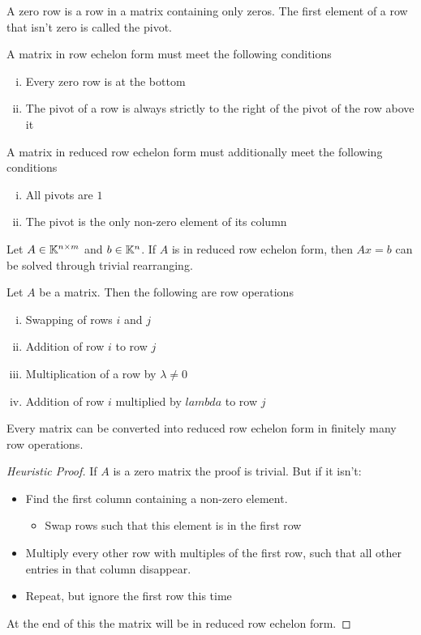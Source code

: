 \documentclass[../../script.tex]{subfiles}
\begin{document}
\begin{defi}
	A zero row is a row in a matrix containing only zeros. The first element of a row that isn't zero is called the pivot.

	A matrix in row echelon form must meet the following conditions
	\begin{enumerate}[(i)]
		 \item Every zero row is at the bottom
		 \item The pivot of a row is always strictly to the right of the pivot of the row above it
	\end{enumerate}

	A matrix in reduced row echelon form must additionally meet the following conditions
	\begin{enumerate}[(i)]
		\item All pivots are $1$
		\item The pivot is the only non-zero element of its column
	\end{enumerate}
\end{defi}

\begin{rem}
	Let $A \in \mathbb{K}^{n \times m}$ and $b \in \mathbb{K}^n$. If $A$ is in reduced row echelon form, then $Ax = b$ can be solved through trivial rearranging.
\end{rem}

\begin{defi}
Let $A$ be a matrix. Then the following are row operations
\begin{enumerate}[(i)]
	\item Swapping of rows $i$ and $j$
	\item Addition of row $i$ to row $j$
	\item Multiplication of a row by $\lambda \ne 0$
	\item Addition of row $i$ multiplied by $lambda$ to row $j$
\end{enumerate}
\end{defi}

\begin{thm}
Every matrix can be converted into reduced row echelon form in finitely many row operations.
\end{thm}
\begin{proof}[Heuristic Proof]
	If $A$ is a zero matrix the proof is trivial. But if it isn't:
	\begin{itemize}
		\item Find the first column containing a non-zero element.
			\begin{itemize}
				\item Swap rows such that this element is in the first row
			\end{itemize}
		\item Multiply every other row with multiples of the first row, such that all other entries in that column disappear.
		\item Repeat, but ignore the first row this time
	\end{itemize}
	At the end of this the matrix will be in reduced row echelon form.
\end{proof}
\end{document}
